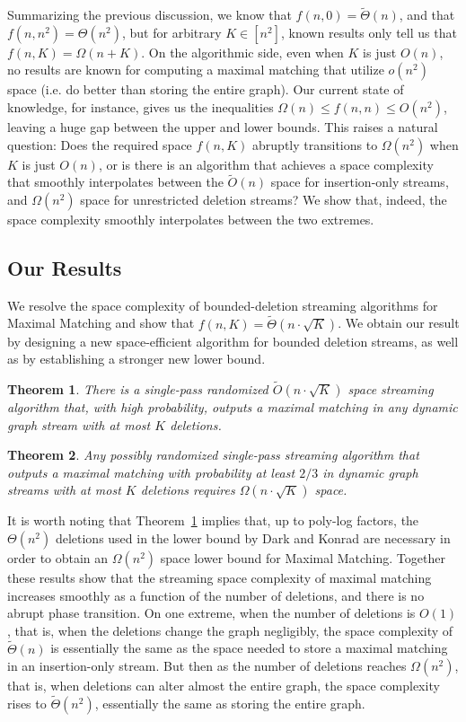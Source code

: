 \documentclass[11pt,a4paper]{article}
\newtheorem{theorem}{Theorem}
\begin{document}
Summarizing the previous discussion, we know that $f(n,0) = \tilde{\Theta}(n)$, and that $f(n,n^2) = \Theta(n^2)$, but for arbitrary $K \in [n^2]$, known results only tell us that $f(n,K) = \Omega(n+K)$. On the algorithmic side, even when $K$ is just $O(n)$, no results are known for computing a maximal matching that utilize $o(n^2)$ space (i.e. do better than storing the entire graph). Our current state of knowledge, for instance, gives us the inequalities $\Omega(n) \le f(n,n) \le O(n^2)$, leaving a huge gap between the upper and lower bounds.
This raises a natural question: Does the required space $f(n,K)$ abruptly transitions to $\Omega(n^2)$ when $K$ is just $O(n)$, or is there is an algorithm that achieves a space complexity that smoothly interpolates between the $\tilde{O}(n)$ space for insertion-only streams, and $\Omega(n^2)$ space for unrestricted deletion streams? We show that, indeed, the space complexity smoothly interpolates between the two extremes.


\subsection{Our Results}
We resolve the space complexity of bounded-deletion streaming algorithms for \textsf{Maximal Matching} and show that $f(n,K)= \tilde{\Theta}(n \cdot \sqrt{K})$. We obtain our result  by designing a new space-efficient algorithm for bounded deletion streams, as well as by establishing a stronger new lower bound. 

\begin{theorem}\label{thm:ub}
There is a single-pass randomized  $\tilde{O}(n \cdot \sqrt{K})$ space streaming algorithm that, with high probability, outputs a maximal matching in any dynamic graph stream with at most $K$ deletions.
\end{theorem}
\setcounter{counterUB}{\value{theorem}}


\begin{theorem}\label{thm:lb}
Any possibly randomized single-pass streaming algorithm that outputs a maximal matching with probability at least $2/3$ in dynamic graph streams with at most $K$ deletions requires $\Omega(n \cdot \sqrt{K})$ space.
\end{theorem}
\setcounter{counterLB}{\value{theorem}}

It is worth noting that Theorem~\ref{thm:ub} implies that, up to poly-log factors, the $\Theta(n^2)$ deletions used in the lower bound by Dark and Konrad are necessary in order to obtain an $\Omega(n^2)$ space lower bound for \textsf{Maximal Matching}. Together these results show that the streaming space complexity of maximal matching increases smoothly as a function of the number of deletions, and there is no abrupt phase transition. On one extreme, when the number of deletions is $O(1)$, that is, when the deletions change the graph negligibly, the space complexity of $\tilde{\Theta}(n)$ is essentially the same as the space needed to store a maximal matching in an insertion-only stream. But then as the number of deletions reaches $\Omega(n^2)$, that is, when deletions can alter almost the entire graph, the space complexity rises to $\tilde{\Theta}(n^2)$, essentially the same as storing the entire graph. 
\end{document}
